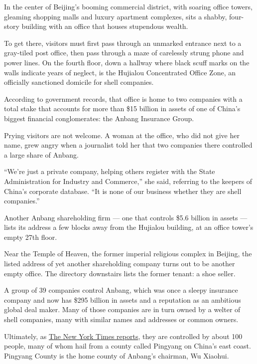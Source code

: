 In the center of Beijing's booming commercial district, with soaring
office towers, gleaming shopping malls and luxury apartment complexes,
sits a shabby, four-story building with an office that houses stupendous
wealth.

To get there, visitors must first pass through an unmarked entrance next
to a gray-tiled post office, then pass through a maze of carelessly
strung phone and power lines. On the fourth floor, down a hallway where
black scuff marks on the walls indicate years of neglect, is the
Hujialou Concentrated Office Zone, an officially sanctioned domicile for
shell companies.

According to government records, that office is home to two companies
with a total stake that accounts for more than \$15 billion in assets of
one of China's biggest financial conglomerates: the Anbang Insurance
Group.

Prying visitors are not welcome. A woman at the office, who did not give
her name, grew angry when a journalist told her that two companies there
controlled a large share of Anbang.

``We're just a private company, helping others register with the State
Administration for Industry and Commerce,'' she said, referring to the
keepers of China's corporate database. ``It is none of our business
whether they are shell companies.''

Another Anbang shareholding firm --- one that controls \$5.6 billion in
assets --- lists its address a few blocks away from the Hujialou
building, at an office tower's empty 27th floor.

Near the Temple of Heaven, the former imperial religious complex in
Beijing, the listed address of yet another shareholding company turns
out to be another empty office. The directory downstairs lists the
former tenant: a shoe seller.

A group of 39 companies control Anbang, which was once a sleepy
insurance company and now has \$295 billion in assets and a reputation
as an ambitious global deal maker. Many of those companies are in turn
owned by a welter of shell companies, many with similar names and
addresses or common owners.

Ultimately, as
\href{http://www.nytimes.com/2016/09/02/business/dealbook/anbang-global-shopping-spree-china-mystery-ownership.html}{The
New York Times reports}, they are controlled by about 100 people, many
of whom hail from a county called Pingyang on China's east coast.
Pingyang County is the home county of Anbang's chairman, Wu Xiaohui.

